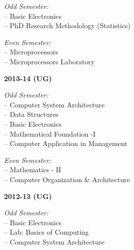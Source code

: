 \documentclass[11pt,a4paper]{moderncv}
\begin{document}
\begin{adjustwidth}{6em}{0pt}
	\begin{adjustwidth}{2em}{0pt}
		\textit{Odd Semester:} \\
		\hspace*{1.5em}-- Basic Electronics \\
		\hspace*{1.5em}-- PhD Research Methodology (Statistics) 
		
		\textit{Even Semester:} \\
		\hspace*{1.5em}-- Microprocessors \\
		\hspace*{1.5em}-- Microprocessors Laboratory \\
	\end{adjustwidth}
	

	
	\textbf{2013-14 (UG)}
	
	\begin{adjustwidth}{2em}{0pt}
		\textit{Odd Semester:} \\
		\hspace*{1.5em}-- Computer System Architecture \\
		\hspace*{1.5em}-- Data Structures \\
		\hspace*{1.5em}-- Basic Electronics \\
		\hspace*{1.5em}-- Mathematical Foundation -I \\
		\hspace*{1.5em}-- Computer Application in Management 
		
		\textit{Even Semester:} \\
		\hspace*{1.5em}-- Mathematics - II \\
		\hspace*{1.5em}-- Computer Organization \& Architecture \\
	\end{adjustwidth}
	

	
	\textbf{2012-13 (UG)}
	
	\begin{adjustwidth}{2em}{0pt}
		\textit{Odd Semester:} \\
		\hspace*{1.5em}-- Basic Electronics \\
		\hspace*{1.5em}-- Lab: Basics of Computing \\
		\hspace*{1.5em}-- Computer System Architecture 
		

\end{adjustwidth}
\end{adjustwidth}
\end{document}
